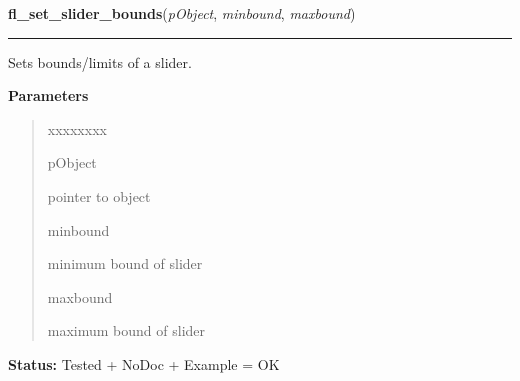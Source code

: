 \hspace{.8\funcindent}\begin{boxedminipage}{\funcwidth}

    \raggedright \textbf{fl\_set\_slider\_bounds}(\textit{pObject}, \textit{minbound}, \textit{maxbound})

    \vspace{-1.5ex}

    \rule{\textwidth}{0.5\fboxrule}
\setlength{\parskip}{2ex}
    Sets bounds/limits of a slider.

\setlength{\parskip}{1ex}
      \textbf{Parameters}
      \vspace{-1ex}

      \begin{quote}
        \begin{Ventry}{xxxxxxxx}

          \item[pObject]

          pointer to object

          \item[minbound]

          minimum bound of slider

          \item[maxbound]

          maximum bound of slider

        \end{Ventry}

      \end{quote}

\textbf{Status:} Tested + NoDoc + Example = OK



    \end{boxedminipage}

    \label{xformslib:library:fl_get_slider_bounds}

    \vspace{0.5ex}


